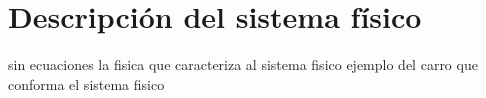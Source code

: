 \documentclass[main.tex]{subfiles}
\begin{document}
\chapter{Descripción del sistema físico}
sin ecuaciones
la fisica que caracteriza al sistema fisico
ejemplo del carro
que conforma el sistema fisico
\end{document}
